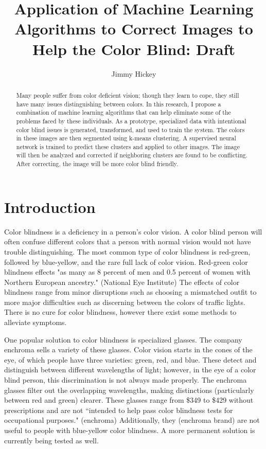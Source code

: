 \documentclass[12pt]{article}
\title{
Application of Machine Learning Algorithms to Correct Images to Help the Color Blind: Draft
}
\author{Jimmy Hickey}
\begin{document}
\maketitle
\doublespacing

\begin{abstract}
Many people suffer from color deficient vision; though they learn to cope, they still have many issues distinguishing between colors. In this research, I propose a combination of machine learning algorithms that can help eliminate some of the problems faced by these individuals. As a prototype, specialized data with intentional color blind issues is generated, transformed, and used to train the system. The colors in these images are then segmented using k-means clustering. A supervised neural network is trained to predict these clusters and applied to other images. The image will then be analyzed and corrected if neighboring clusters are found to be conflicting. After correcting, the image will be more color blind friendly.

\end{abstract}

\section{Introduction}

Color blindness is a deficiency in a person's color vision. A color blind person will often confuse different colors that a person with normal vision would not have trouble distinguishing. The most common type of color blindness is red-green, followed by blue-yellow, and the rare full lack of color vision. Red-green color blindness effects "as many as 8 percent of men and 0.5 percent of women with Northern European ancestry." (National Eye Institute) The effects of color blindness range from minor disruptions such as choosing a mismatched outfit to more major difficulties such as discerning between the colors of traffic lights.
There is no cure for color blindness, however there exist some methods to alleviate symptoms. 

One popular solution to color blindness is specialized glasses. The company enchroma sells a variety of these glasses. Color vision starts in the cones of the eye, of which people have three varieties: green, red, and blue. These detect and distinguish between different wavelengths of light; however, in the eye of a color blind person, this discrimination is not always made properly. The enchroma glasses filter out the overlapping wavelengths, making distinctions (particularly between red and green) clearer. These glasses range from \$349 to \$429 without prescriptions and are not ``intended to help pass color blindness tests for occupational purposes." (enchroma) Additionally, they (enchroma brand) are not useful to people with blue-yellow color blindness. A more permanent solution is currently being tested as well.
\end{document}
